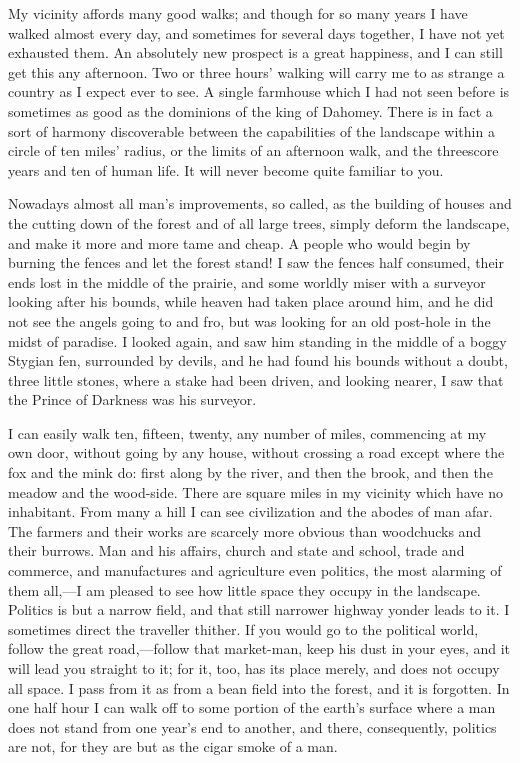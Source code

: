 \documentclass[twoside,openright,10pt]{memoir} %
\begin{document}
My vicinity affords many good walks; and though for so many years I have walked almost every day, and sometimes for several days together, I have not yet exhausted them. An absolutely new prospect is a great happiness, and I can still get this any afternoon. Two or three hours’ walking will carry me to as strange a country as I expect ever to see. A single farmhouse which I had not seen before is sometimes as good as the dominions of the king of Dahomey. There is in fact a sort of harmony discoverable between the capabilities of the landscape within a circle of ten miles’ radius, or the limits of an afternoon walk, and the threescore years and ten of human life. It will never become quite familiar to you.

Nowadays almost all man’s improvements, so called, as the building of houses and the cutting down of the forest and of all large trees, simply deform the landscape, and make it more and more tame and cheap. A people who would begin by burning the fences and let the forest stand! I saw the fences half consumed, their ends lost in the middle of the prairie, and some worldly miser with a surveyor looking after his bounds, while heaven had taken place around him, and he did not see the angels going to and fro, but was looking for an old post-hole in the midst of paradise. I looked again, and saw him standing in the middle of a boggy Stygian fen, surrounded by devils, and he had found his bounds without a doubt, three little stones, where a stake had been driven, and looking nearer, I saw that the Prince of Darkness was his surveyor.

I can easily walk ten, fifteen, twenty, any number of miles, commencing at my own door, without going by any house, without crossing a road except where the fox and the mink do: first along by the river, and then the brook, and then the meadow and the wood-side. There are square miles in my vicinity which have no inhabitant. From many a hill I can see civilization and the abodes of man afar. The farmers and their works are scarcely more obvious than woodchucks and their burrows. Man and his affairs, church and state and school, trade and commerce, and manufactures and agriculture even politics, the most alarming of them all,—I am pleased to see how little space they occupy in the landscape. Politics is but a narrow field, and that still narrower highway yonder leads to it. I sometimes direct the traveller thither. If you would go to the political world, follow the great road,—follow that market-man, keep his dust in your eyes, and it will lead you straight to it; for it, too, has its place merely, and does not occupy all space. I pass from it as from a bean field into the forest, and it is forgotten. In one half hour I can walk off to some portion of the earth’s surface where a man does not stand from one year’s end to another, and there, consequently, politics are not, for they are but as the cigar smoke of a man.
\end{document}
